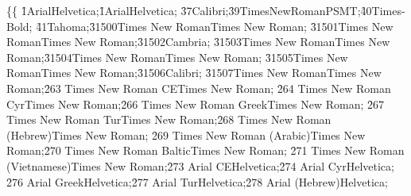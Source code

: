 \{\ansi{}\{
{\f1\fbidi \fswiss{}Arial{\*\falt Helvetica};}{\f1\fbidi \fswiss{}Arial{\*\falt Helvetica};}
{\f37\fbidi \fswiss{}Calibri;}{\f39\fbidi \fnil{}TimesNewRomanPSMT;}{\f40\fbidi \fnil{}Times-Bold;}
{\f41\fbidi \fswiss{}Tahoma;}{\flomajor\f31500\fbidi \froman{}Times New Roman{\*\falt Times New Roman};}
{\fdbmajor\f31501\fbidi \froman{}Times New Roman{\*\falt Times New Roman};}{\fhimajor\f31502\fbidi \froman{}Cambria;}
{\fbimajor\f31503\fbidi \froman{}Times New Roman{\*\falt Times New Roman};}{\flominor\f31504\fbidi \froman{}Times New Roman{\*\falt Times New Roman};}
{\fdbminor\f31505\fbidi \froman{}Times New Roman{\*\falt Times New Roman};}{\fhiminor\f31506\fbidi \fswiss{}Calibri;}
{\fbiminor\f31507\fbidi \froman{}Times New Roman{\*\falt Times New Roman};}{\f263\fbidi \froman{} Times New Roman CE{\*\falt Times New Roman};}
{\f264\fbidi \froman{} Times New Roman Cyr{\*\falt Times New Roman};}{\f266\fbidi \froman{} Times New Roman Greek{\*\falt Times New Roman};}
{\f267\fbidi \froman{} Times New Roman Tur{\*\falt Times New Roman};}{\f268\fbidi \froman{} Times New Roman (Hebrew){\*\falt Times New Roman};}
{\f269\fbidi \froman{} Times New Roman (Arabic){\*\falt Times New Roman};}{\f270\fbidi \froman{} Times New Roman Baltic{\*\falt Times New Roman};}
{\f271\fbidi \froman{} Times New Roman (Vietnamese){\*\falt Times New Roman};}{\f273\fbidi \fswiss{} Arial CE{\*\falt Helvetica};}{\f274\fbidi \fswiss{} Arial Cyr{\*\falt Helvetica};}
{\f276\fbidi \fswiss{} Arial Greek{\*\falt Helvetica};}{\f277\fbidi \fswiss{} Arial Tur{\*\falt Helvetica};}{\f278\fbidi \fswiss{} Arial (Hebrew){\*\falt Helvetica};}
